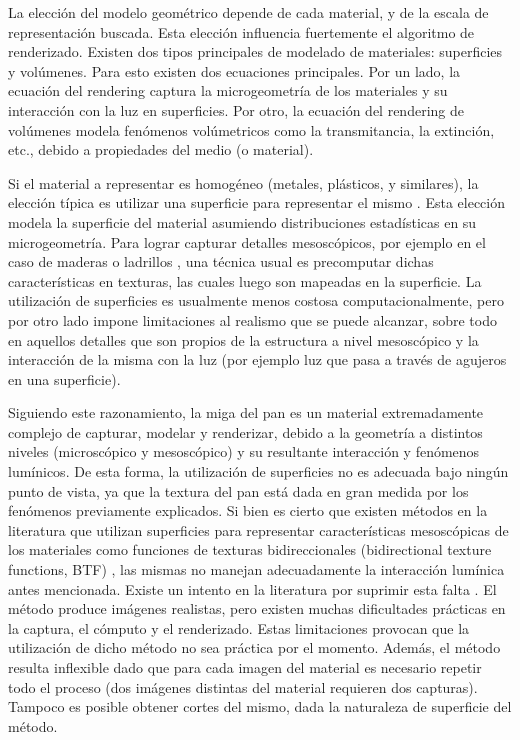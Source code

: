 La elección del modelo geométrico depende de cada material, y de la escala de representación buscada.
Esta elección influencia fuertemente el algoritmo de renderizado. 
Existen dos tipos principales de modelado de materiales: superficies y volúmenes.
Para esto existen dos ecuaciones principales.
Por un lado, la ecuación del rendering \cite{Kajiya1986} captura la microgeometría de los materiales y su interacción con la luz en superficies.
Por otro, la ecuación del rendering de volúmenes \cite{Kajiya1984} modela fenómenos volúmetricos como la transmitancia, la extinción, etc., debido a propiedades del medio (o material).

Si el material a representar es homogéneo (metales, plásticos, y similares), la elección típica es utilizar una superficie para representar el mismo \cite{Neumann1999}.
Esta elección modela la superficie del material asumiendo distribuciones estadísticas en su microgeometría.
Para lograr capturar detalles mesoscópicos, por ejemplo en el caso de maderas o ladrillos \cite{Lefebvre2000}, una técnica usual es precomputar dichas características en texturas, las cuales luego son mapeadas en la superficie.
La utilización de superficies es usualmente menos costosa computacionalmente, pero por otro lado impone limitaciones al realismo que se puede alcanzar, sobre todo en aquellos detalles que son propios de la estructura a nivel mesoscópico y la interacción de la misma con la luz (por ejemplo luz que pasa a través de agujeros en una superficie).

Siguiendo este razonamiento, la miga del pan es un material extremadamente complejo de capturar, modelar y renderizar, debido a la geometría a distintos niveles (microscópico y mesoscópico) y su resultante interacción y fenómenos lumínicos.
De esta forma, la utilización de superficies no es adecuada bajo ningún punto de vista, ya que la textura del pan está dada en gran medida por los fenómenos previamente explicados.
Si bien es cierto que existen métodos en la literatura que utilizan superficies para representar características mesoscópicas de los materiales como funciones de texturas bidireccionales (bidirectional texture functions, BTF) \cite{Tong2002}, las mismas no manejan adecuadamente la interacción lumínica antes mencionada.
Existe un intento en la literatura por suprimir esta falta \cite{Tong2005}.
El método produce imágenes realistas, pero existen muchas dificultades prácticas en la captura, el cómputo y el renderizado.
Estas limitaciones provocan que la utilización de dicho método no sea práctica por el momento.
Además, el método resulta inflexible dado que para cada imagen del material es necesario repetir todo el proceso (dos imágenes distintas del material requieren dos capturas).
Tampoco es posible obtener cortes del mismo, dada la naturaleza de superficie del método.

